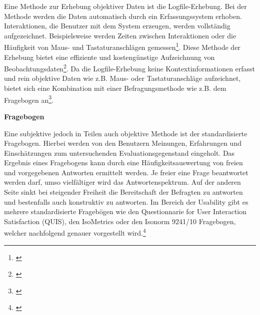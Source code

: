 Eine Methode zur Erhebung objektiver Daten ist die Logfile-Erhebung. Bei der Methode werden die Daten automatisch durch ein Erfassungssystem erhoben. Interaktionen, die Benutzer mit dem System erzeugen, werden vollständig aufgezeichnet. Beispielsweise werden Zeiten zwischen Interaktionen oder die Häufigkeit von Maus- und Tastaturanschlägen gemessen\footnote{\cite[vgl.][63]{Hegner2003}}. Diese Methode der Erhebung bietet eine effiziente und kostengünstige Aufzeichnung von Beobachtungsdaten\footnote{\cite[vgl.][Kap. 65.3]{Baur2014}}. Da die Logfile-Erhebung keine Kontextinformationen erfasst und rein objektive Daten wie z.B. Maus- oder Tastaturanschläge aufzeichnet, bietet sich eine Kombination mit einer Befragungsmethode wie z.B. dem Fragebogen an\footnote{\cite[vgl.][17\psq]{Hegner2003}}.

\textbf{Fragebogen}

Eine subjektive jedoch in Teilen auch objektive Methode ist der standardisierte Fragebogen. Hierbei werden von den Benutzern Meinungen, Erfahrungen und Einschätzungen zum untersuchenden Evaluationsgegenstand eingeholt. Das Ergebnis eines Fragebogens kann durch eine Häufigkeitsauswertung von freien und vorgegebenen Antworten ermittelt werden. Je freier eine Frage beantwortet werden darf, umso vielfältiger wird das Antwortenspektrum. Auf der anderen Seite sinkt bei steigender Freiheit die Bereitschaft der Befragten zu antworten und bestenfalls auch konstruktiv zu antworten. Im Bereich der Usability gibt es mehrere standardisierte Fragebögen wie den Questionnarie for User Interaction Satisfaction (QUIS), den IsoMetrics oder den Isonorm 9241/10 Fragebogen, welcher nachfolgend genauer vorgestellt wird.\footnote{\cite[vgl.][Kap. 4.5.1.1]{Hegner2003}}

